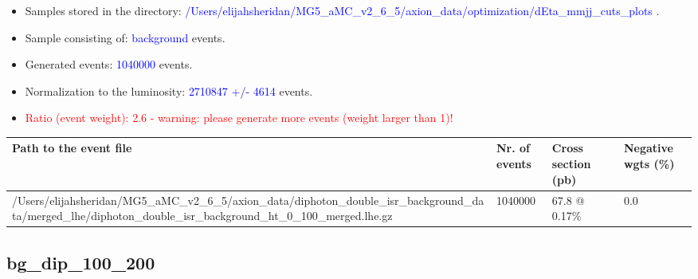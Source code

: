 \documentclass[a4paper, 10pt]{article}
\begin{document}
\begin{itemize}
  \item Samples stored in the directory: \textcolor{blue}{/\-Users/\-elijahsheridan/\-MG5\_aMC\_v2\_6\_5/\-axion\_data/\-optimization/\-dEta\_mmjj\_cuts\_plots} .
   \item Sample consisting of: \textcolor{blue}{background}  events.
   \item Generated events: \textcolor{blue}{1040000 }  events.
   \item Normalization to the luminosity: \textcolor{blue}{2710847}\textcolor{blue}{ +/\-- }\textcolor{blue}{4614 }  events.
   \item\textcolor{red}{Ratio (event weight): }\textcolor{red}{2.6 }\textcolor{red}{ - warning: please generate more events (weight larger than 1)!}
\textcolor{red}{}
\end{itemize}
\begin{table}[H]
  \begin{center}
    \begin{tabular}{|m{55.0mm}|m{25.0mm}|m{30.0mm}|m{30.0mm}|}
      \hline
      {\cellcolor{yellow}         Path to the event file}& {\cellcolor{yellow}         Nr. of events}& {\cellcolor{yellow}         Cross section (pb)}& {\cellcolor{yellow}         Negative wgts (\%)}\\
      \hline
      {\cellcolor{white}          /\-Users/\-elijahsheridan/\-MG5\_aMC\_v2\_6\_5/\-axion\_data/\-diphoton\_double\_isr\_background\_data/\-merged\_lhe/\-diphoton\_double\_isr\_background\_ht\_0\_100\_merged.lhe.gz}& {\cellcolor{white}          1040000}& {\cellcolor{white}          67.8 @ 0.17\%}& {\cellcolor{white}          0.0}\\
\hline
    \end{tabular}
  \end{center}
\end{table}

\subsection{ bg\_dip\_100\_200}
\end{document}
